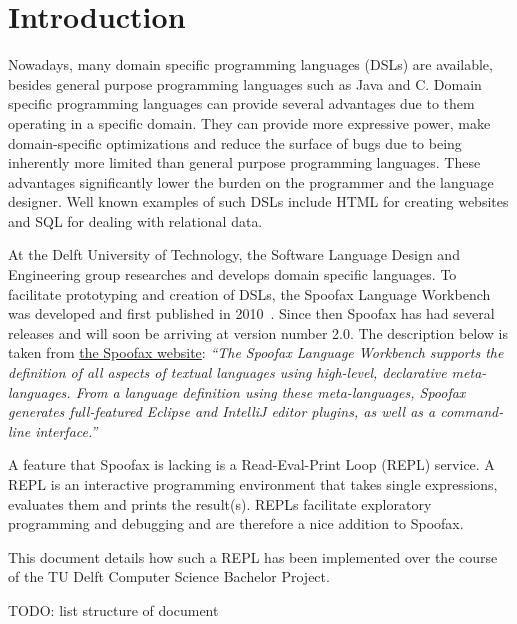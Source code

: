 \chapter{Introduction}
\label{cha:introduction}

Nowadays, many domain specific programming languages (DSLs) are available,
besides general purpose programming languages such as Java and C. Domain
specific programming languages can provide several advantages due to them
operating in a specific domain. They can provide more expressive power, make
domain-specific optimizations and reduce the surface of bugs due to being
inherently more limited than general purpose programming languages. These
advantages significantly lower the burden on the programmer and the language
designer. Well known examples of such DSLs include HTML for creating websites
and SQL for dealing with relational data.

At the Delft University of Technology, the Software Language Design and
Engineering group researches and develops domain specific languages. To
facilitate prototyping and creation of DSLs, the Spoofax Language Workbench was
developed and first published in 2010~\cite{Kats10a}. Since then Spoofax has had
several releases and will soon be arriving at version number 2.0. The
description below is taken from \href{http://spoofax.org}{the Spoofax website}:
\textit{``The Spoofax Language Workbench supports the definition of all aspects
of textual languages using high-level, declarative meta-languages. From a
language definition using these meta-languages, Spoofax generates full-featured
Eclipse and IntelliJ editor plugins, as well as a command-line interface.''}

A feature that Spoofax is lacking is a Read-Eval-Print Loop (REPL) service. A
REPL is an interactive programming environment that takes single expressions,
evaluates them and prints the result(s). REPLs facilitate exploratory
programming and debugging and are therefore a nice addition to Spoofax.

This document details how such a REPL has been implemented over the course of
the TU Delft Computer Science Bachelor Project.

TODO: list structure of document


